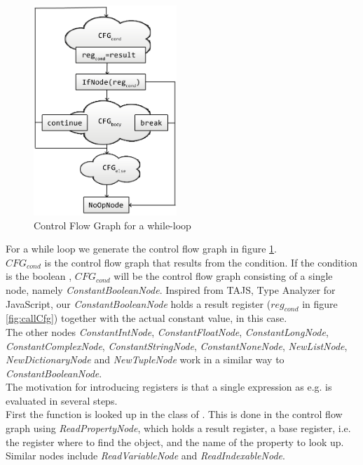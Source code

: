 \begin{figure}
	\vspace{-20pt}
	\begin{center}
		\includegraphics[width=0.48\textwidth]{images/while.png}
	\end{center}
	\vspace{-10pt}
	\caption{Control Flow Graph for a while-loop}
	\label{fig:whileCfg}
	\vspace{-10pt}
\end{figure}
For a while loop we generate the control flow graph in figure \ref{fig:whileCfg}. \\
$CFG_{cond}$ is the control flow graph that results from the condition. If the condition is the boolean , $CFG_{cond}$ will be the control flow graph consisting of a single node, namely \textit{ConstantBooleanNode}. Inspired from TAJS, Type Analyzer for JavaScript, our \textit{ConstantBooleanNode} holds a result register ($reg_{cond}$ in figure \ref{fig:callCfg}) together with the actual constant value,  in this case. \\
The other nodes \textit{ConstantIntNode}, \textit{ConstantFloatNode}, \textit{ConstantLongNode}, \textit{ConstantComplexNode}, \textit{ConstantStringNode}, \textit{ConstantNoneNode}, \textit{NewListNode}, \textit{NewDictionaryNode} and \textit{NewTupleNode} work in a similar way to \textit{ConstantBooleanNode}. \\
The motivation for introducing registers is that a single expression as e.g.  is evaluated in several steps. \\
First the function  is looked up in the class of . This is done in the control flow graph using \textit{ReadPropertyNode}, which holds a result register, a base register, i.e. the register where to find the object, and the name of the property to look up. Similar nodes include \textit{ReadVariableNode} and \textit{ReadIndexableNode}. \\
